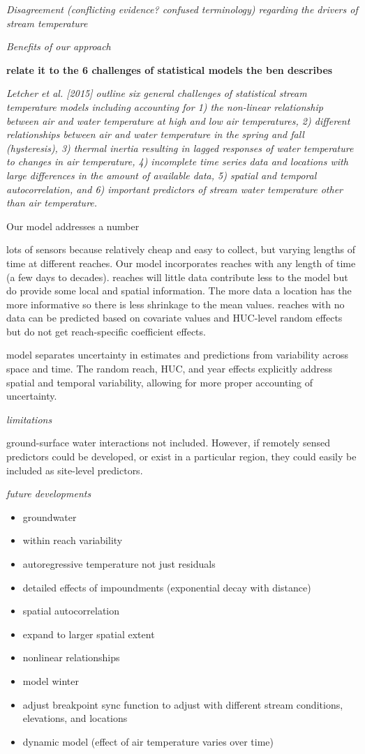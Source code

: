 \emph{Disagreement (conflicting evidence? confused terminology)
regarding the drivers of stream temperature}

\emph{Benefits of our approach}

\textbf{relate it to the 6 challenges of statistical models the ben
describes}

\emph{Letcher et al. {[}2015{]} outline six general challenges of
statistical stream temperature models including accounting for 1) the
non-linear relationship between air and water temperature at high and
low air temperatures, 2) different relationships between air and water
temperature in the spring and fall (hysteresis), 3) thermal inertia
resulting in lagged responses of water temperature to changes in air
temperature, 4) incomplete time series data and locations with large
differences in the amount of available data, 5) spatial and temporal
autocorrelation, and 6) important predictors of stream water temperature
other than air temperature.}

Our model addresses a number

lots of sensors because relatively cheap and easy to collect, but
varying lengths of time at different reaches. Our model incorporates
reaches with any length of time (a few days to decades). reaches will
little data contribute less to the model but do provide some local and
spatial information. The more data a location has the more informative
so there is less shrinkage to the mean values. reaches with no data can
be predicted based on covariate values and HUC-level random effects but
do not get reach-specific coefficient effects.

model separates uncertainty in estimates and predictions from
variability across space and time. The random reach, HUC, and year
effects explicitly address spatial and temporal variability, allowing
for more proper accounting of uncertainty.

\emph{limitations}

ground-surface water interactions not included. However, if remotely
sensed predictors could be developed, or exist in a particular region,
they could easily be included as site-level predictors.

\emph{future developments}

\begin{itemize}
\tightlist
\item
  groundwater
\item
  within reach variability
\item
  autoregressive temperature not just residuals
\item
  detailed effects of impoundments (exponential decay with distance)
\item
  spatial autocorrelation
\item
  expand to larger spatial extent
\item
  nonlinear relationships
\item
  model winter
\item
  adjust breakpoint sync function to adjust with different stream
  conditions, elevations, and locations
\item
  dynamic model (effect of air temperature varies over time)
\end{itemize}


